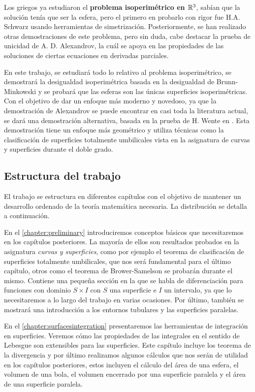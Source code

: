 Los griegos ya estudiaron el \textbf{problema isoperimétrico en $\mathbb{R}^3$}, sabían que la solución tenía que ser la esfera, pero el primero en probarlo con rigor fue H.A. Schwarz usando herramientas de simetrización. Posteriormente, se han realizado otras demostraciones de este problema, pero sin duda, cabe destacar la prueba de unicidad de A. D. Alexandrov, la cuál se apoya en las propiedades de las soluciones de ciertas ecuaciones en derivadas parciales.

En este trabajo, se estudiará todo lo relativo al problema isoperimétrico, se demostrará la desigualdad isoperimétrica basada en la desigualdad de Brunn-Minkowski y se probará que las esferas son las únicas superficies isoperimétricas. Con el objetivo de dar un enfoque más moderno y novedoso, ya que la demostración de Alexandrov se puede encontrar en casi toda la literatura actual, se dará una demostración alternativa, basada en la prueba de H. Wente en \cite{wenteproof}. Esta demostración tiene un enfoque más geométrico y utiliza técnicas como la clasificación de superficies totalmente umbilicales vista en la asignatura de curvas y superficies durante el doble grado.

\subsection{Estructura del trabajo}

El trabajo se estructura en diferentes capítulos con el objetivo de mantener un desarrollo ordenado de la teoría matemática necesaria. La distribución se detalla a continuación.

En el \autoref{chapter:preliminary} introduciremos conceptos básicos que necesitaremos en los capítulos posteriores. La mayoría de ellos son resultados probados en la asignatura \emph{curvas y superficies}, como por ejemplo el teorema de clasificación de superficies totalmente umbilicales, que nos será fundamental para el último capítulo, otros como el teorema de Brower-Samelson se probarán durante el mismo. Contiene una pequeña sección en la que se habla de diferenciación para funciones con dominio $S\times I$ con $S$ una superficie e $I$ un intervalo, ya que lo necesitaremos a lo largo del trabajo en varias ocasiones. Por último, también se mostrará una introducción a los entornos tubulares y las superficies paralelas.

En el \autoref{chapter:surfacesintegration} presentaremos las herramientas de integración en superficies. Veremos cómo las propiedades de las integrales en el sentido de Lebesgue son extensibles para las superficies. Este capítulo incluye los teorema de la divergencia y por último realizamos algunos cálculos que nos serán de utilidad en los capítulos posteriores, estos incluyen el cálculo del área de una esfera, el volumen de una bola, el volumen encerrado por una superficie paralela y el área de una superficie paralela.

